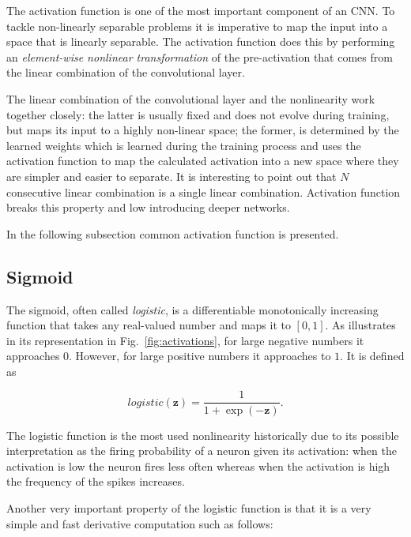 The activation function is one of the most important component of an CNN. To tackle non-linearly separable problems it is imperative to map the input into a space that is linearly separable. The activation function does this by performing an \emph{element-wise nonlinear transformation} of the pre-activation that comes from the linear combination of the convolutional layer.

The linear combination of the convolutional layer and the nonlinearity work together closely: the latter is usually fixed and does not evolve during training, but maps its input to a highly non-linear space; the former, is determined by the learned weights which is learned during the training process and uses the activation function to map the calculated activation into a new space where they are simpler and easier to separate. It is interesting to point out that $N$ consecutive linear combination is a single linear combination. Activation function breaks this property and low introducing deeper networks.

In the following subsection common activation function is presented.

\subsection{Sigmoid}\label{sec:logistic}
The sigmoid, often called \emph{logistic}, is a differentiable monotonically
increasing function that takes any real-valued number and maps it to $[0, 1]$.
As illustrates in its representation in Fig.~\ref{fig:activations}, for large
negative numbers it approaches $0$. However, for large positive numbers it
approaches to $1$. It is defined as

\begin{equation}\label{eq:logistic}
    logistic(\mathbf{z}) = \frac{1}{1+\exp(-\mathbf{z})}.
\end{equation}

\noindent The logistic function is the most used nonlinearity historically due to its possible interpretation as the firing probability of a neuron given its activation: when the activation is low the neuron fires less often whereas when the activation is high the frequency of the spikes increases.

Another very important property of the logistic function is that it is a very
simple and fast derivative computation such as follows:

